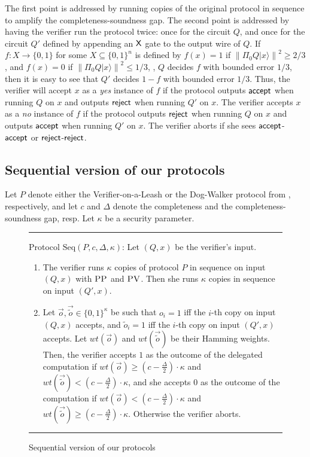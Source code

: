 \documentclass{toc}
\newcommand{\ket}[1]{|#1\rangle}
\newcommand{\norm}[1]{\left\|#1\right\|}
\newcommand{\pv}{\textsc{PV}}
\newcommand{\pp}{\textsc{PP}}
\begin{document}
The first point is addressed by running copies of the original protocol in sequence to amplify the completeness-soundness gap. The second point is addressed by having the verifier run the protocol twice: once for the circuit $Q$, and once for the circuit $Q'$ defined by appending an $\sf X$ gate to the output wire of $Q$. If $f:X\rightarrow \{0,1\}$ for some $X\subseteq \{0,1\}^n$ is defined by $f(x)=1$ if $\norm{\Pi_0 Q\ket{x}}^2\geq 2/3$, and $f(x)=0$ if $\norm{\Pi_0 Q\ket{x}}^2\leq 1/3$, \ie, $Q$ decides $f$ with bounded error $1/3$, then it is easy to see that $Q'$ decides $1-f$ with bounded error $1/3$. Thus, the verifier will accept $x$ as a \textit{yes} instance of $f$ if the protocol outputs ${\sf accept}$ when running $Q$ on $x$ and outputs $\sf reject$ when running $Q'$ on $x$. The verifier accepts $x$ as a \textit{no} instance of $f$ if the protocol outputs $\sf reject$ when running $Q$ on $x$ and outputs $\sf accept$ when running $Q'$ on $x$. The verifier aborts if she sees $\sf accept$-$\sf accept$ or $\sf reject$-$\sf reject$. 



\subsection{Sequential version of our protocols}


Let $P$ denote either the %
Verifier-on-a-Leash  %
or the Dog-Walker protocol from  , respectively, %
and let $c$ and $\Delta$ denote the completeness and 
%
the completeness-soundness gap, resp.  %
Let $\kappa$ be a security parameter.

\begin{figure}[H]
%
\rule[1ex]{\textwidth}{0.5pt}  %
\justify
Protocol $\mbox{Seq}(P,c,\Delta, \kappa)$: Let $(Q,x)$ be the verifier's input. 
\begin{enumerate}
\item The verifier runs $\kappa$ copies of protocol $P$ in sequence on input $(Q,x)$ with $\pp$ and $\pv$. Then she runs $\kappa$ copies in sequence on input $(Q',x)$. 
\item Let $\vec{o}, \vec{\tilde{o}} \in \{0,1\}^{\kappa}$ be such that $o_i = 1$ iff the $i$-th copy on input $(Q,x)$ accepts, and $\tilde{o}_i = 1$ iff the $i$-th copy on input $(Q',x)$ accepts. Let $wt(\vec{o})$ and $wt(\vec{\tilde{o}})$ be their Hamming weights. Then, the verifier accepts $1$ as the outcome of the delegated computation if $wt(\vec{o}) \geq (c- \frac{\Delta}{2}) \cdot \kappa$ and $wt(\vec{\tilde{o}}) < (c- \frac{\Delta}{2}) \cdot \kappa$, and she accepts $0$ as the outcome of the computation if $wt(\vec{o}) < (c- \frac{\Delta}{2})\cdot \kappa$ and $wt(\vec{\tilde{o}}) \geq (c- \frac{\Delta}{2}) \cdot \kappa$. Otherwise the verifier aborts.

\end{enumerate}
%
\rule[2ex]{\textwidth}{0.5pt} \vspace{-.5cm}  %
\caption{Sequential version of our protocols} \label{fig: gardenhose-protocol-parallel}
\end{figure}
\end{document}
